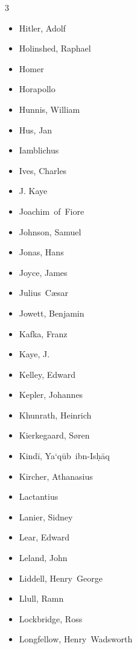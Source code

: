 \documentclass[10pt,makeidx]{extreport}
\begin{document}
\begin{multicols}{3}
\begin{itemize}
		\item Hitler, Adolf
		\item Holinshed, Raphael
		\item Homer
		\item Horapollo
		\item Hunnis, William
		\item Hus, Jan
		\item Iamblichus
		\item Ives, Charles
		\item J. Kaye
		\item Joachim~of~Fiore
		\item Johnson, Samuel
		\item Jonas, Hans
		\item Joyce, James
		\item Julius~Cæsar
		\item Jowett, Benjamin
		\item Kafka, Franz
		\item Kaye, J.
		\item Kelley, Edward
		\item Kepler, Johannes
		\item Khunrath, Heinrich
		\item Kierkegaard, Søren
		\item Kindī, Ya‘qūb~ibn-Isḥāq
		\item Kircher, Athanasius
		\item Lactantius
		\item Lanier, Sidney
		\item Lear, Edward
		\item Leland, John
		\item Liddell, Henry~George
		\item Llull, Ramn
		\item Lockbridge, Ross
		\item Longfellow, Henry~Wadsworth

\end{itemize}
\end{multicols}
\end{document}
